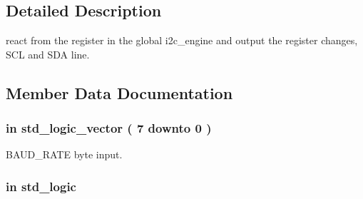\subsection{Detailed Description}
react from the register in the global i2c\+\_\+engine and output the register changes, S\+CL and S\+DA line. 

\subsection{Member Data Documentation}
\subsubsection[{\texorpdfstring{B\+A\+U\+D\+\_\+\+R\+A\+TE}{BAUD_RATE}}]{ {\bfseries \textcolor{vhdlchar}{in}\textcolor{vhdlchar}{ }} {\bfseries \textcolor{vhdlchar}{std\+\_\+logic\+\_\+vector}\textcolor{vhdlchar}{ }\textcolor{vhdlchar}{(}\textcolor{vhdlchar}{ }\textcolor{vhdlchar}{ } \textcolor{vhdldigit}{7} \textcolor{vhdlchar}{ }\textcolor{vhdlchar}{downto}\textcolor{vhdlchar}{ }\textcolor{vhdlchar}{ } \textcolor{vhdldigit}{0} \textcolor{vhdlchar}{ }\textcolor{vhdlchar}{)}\textcolor{vhdlchar}{ }} \hspace{0.3cm}{\ttfamily [Port]}}\hypertarget{classi2c__master__engine_a82e79d6ce7e6595b82fd7bcfae4dce09}{}\label{classi2c__master__engine_a82e79d6ce7e6595b82fd7bcfae4dce09}


B\+A\+U\+D\+\_\+\+R\+A\+TE byte input. 

\subsubsection[{\texorpdfstring{clk}{clk}}]{ {\bfseries \textcolor{vhdlchar}{in}\textcolor{vhdlchar}{ }} {\bfseries \textcolor{vhdlchar}{std\+\_\+logic}\textcolor{vhdlchar}{ }} \hspace{0.3cm}{\ttfamily [Port]}}\hypertarget{classi2c__master__engine_a4a4609c199d30b3adebbeb3a01276ec5}{}\label{classi2c__master__engine_a4a4609c199d30b3adebbeb3a01276ec5}


